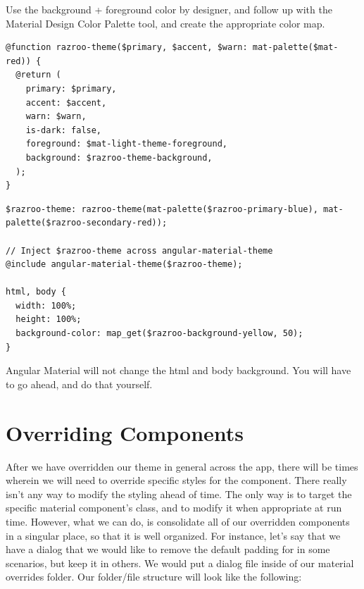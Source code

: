 Use the background + foreground color by designer, and follow up with the 
Material Design Color Palette tool, and create the appropriate color map.

\begin{lstlisting}[caption=What custom theme function would look like]
@function razroo-theme($primary, $accent, $warn: mat-palette($mat-red)) {
  @return (
    primary: $primary,
    accent: $accent,
    warn: $warn,
    is-dark: false,
    foreground: $mat-light-theme-foreground,
    background: $razroo-theme-background,
  );
}  
\end{lstlisting}

\begin{lstlisting}[caption=html and body override]
$razroo-theme: razroo-theme(mat-palette($razroo-primary-blue), mat-palette($razroo-secondary-red));

// Inject $razroo-theme across angular-material-theme
@include angular-material-theme($razroo-theme);  

html, body {
  width: 100%;
  height: 100%;
  background-color: map_get($razroo-background-yellow, 50);
}
\end{lstlisting}

Angular Material will not change the html and body background. You will have to
go ahead, and do that yourself. 

\section{Overriding Components}
After we have overridden our theme in general across the app, there will be 
times wherein we will need to override specific styles for the component. 
There really isn't any way to modify the styling ahead of time. The only way
is to target the specific material component's class, and to modify it when 
appropriate at run time. However, what we can do, is consolidate all of our 
overridden components in a singular place, so that it is well organized. For
instance, let's say that we have a dialog that we would like to remove the 
default padding for in some scenarios, but keep it in others. We would put a 
dialog file inside of our material overrides folder. Our folder/file structure 
will look like the following: 

